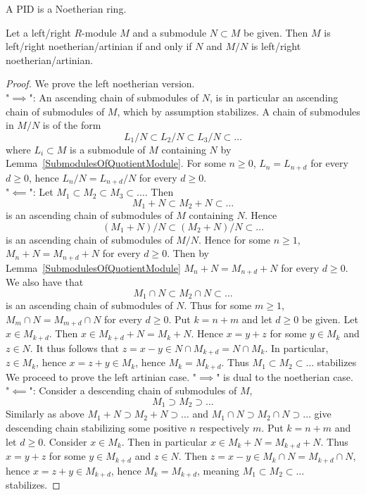\begin{corollary}
    A PID is a Noetherian ring.
\end{corollary}
\begin{lemma}\label{ModuleNoetherianIffQuotientModuleAndSubModuleNoetherian}
    Let a left/right $R$-module $M$ and a submodule $N\subset M$ be given. Then $M$ is left/right noetherian/artinian if and only if $N$ and $M/N$ is left/right noetherian/artinian. 
\end{lemma}
\begin{proof}
    We prove the left noetherian version.\\
    "$\implies$": An ascending chain of submodules of $N$, is in particular an ascending chain of submodules of $M$, which by assumption stabilizes. A chain of submodules in $M/N$ is of the form 
    $$L_1/N\subset L_2/N\subset L_3/N \subset\dots$$
    where $L_i\subset M$ is a submodule of $M$ containing $N$ by Lemma~\ref{SubmodulesOfQuotientModule}. For some $n\geq 0$, $L_n = L_{n+d}$ for every $d\geq 0$, hence $L_n/N = L_{n+d}/N$ for every $d\geq 0$.\\
    "$\impliedby$": Let $M_1\subset M_2\subset M_3\subset \dots $. Then 
    $$M_1+N\subset M_2 + N\subset \dots $$
    is an ascending chain of submodules of $M$ containing $N$. Hence 
    $$(M_1+N)/N \subset (M_2+N)/N \subset \dots$$
    is an ascending chain of submodules of $M/N$. Hence for some $n\geq 1$, $M_{n}+N=M_{n+d}+N$ for every $d\geq 0$. Then by Lemma~\ref{SubmodulesOfQuotientModule} $M_n+N =M_{n+d} +N$ for every $d\geq 0$. We also have that 
    $$M_1\cap N \subset M_2\cap N\subset \dots$$
    is an ascending chain of submodules of $N$. Thus for some $m\geq 1$, $M_m \cap N = M_{m+d} \cap N$ for every $d\geq 0$. Put $k = n+m$ and let $d\geq 0$ be given. Let $x\in M_{k+d}$. Then $x \in M_{k+d}+N = M_k+N$. Hence $x = y+z$ for some $y\in M_k$ and $z \in N$. It thus follows that $z = x-y \in N\cap M_{k+d} = N \cap M_k$. In particular, $z \in M_k$, hence $x = z+y \in M_k$, hence $M_k = M_{k+d}$. Thus $M_1\subset M_2\subset \dots$ stabilizes\\
    We proceed to prove the left artinian case. "$\implies$" is dual to the noetherian case.\\
    "$\impliedby$": Consider a descending chain of submodules of $M$,
    $$M_1\supset M_2\supset\dots $$
    Similarly as above $M_1+N\supset M_2+N \supset \dots$ and $M_1\cap N \supset M_2\cap N\supset \dots$ give descending chain stabilizing some positive $n$ respectively $m$. Put $k=n+m$ and let $d\geq 0$. Consider $x\in M_k$. Then in particular $x \in M_k + N = M_{k+d} + N$. Thus $x = y+z$ for some $y\in M_{k+d}$ and $z\in N$. Then $z = x-y \in M_k \cap N =M_{k+d}\cap N$, hence $x =z+y \in M_{k+d}$, hence $M_k = M_{k+d}$, meaning $M_1\subset M_2\subset \dots$ stabilizes. 
\end{proof}
